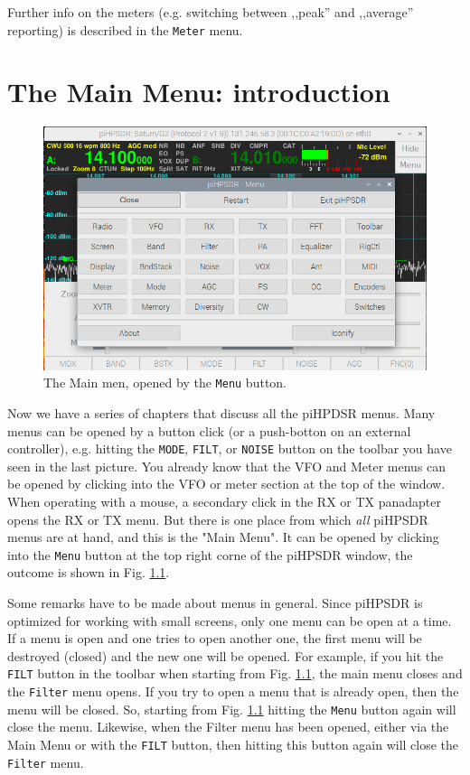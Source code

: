 \documentclass[12pt]{book}
\def\rett#1{\texttt{\color{red}#1}}
\def\bltt#1{\texttt{\color{blue}#1}}
\begin{document}
Further info on the meters (e.g. switching between ,,peak'' and ,,average'' reporting)
is described in the \bltt{Meter} menu.

\chapter{The Main Menu: introduction}

\begin{figure}[ht]
\center
\includegraphics[width=12cm]{MainMenu.png}
\caption{The Main men, opened by the \rett{Menu} button.}
\label{fig:MainMenu}
\end{figure}

Now we have a series of chapters that discuss all the piHPDSR menus. Many menus can be
opened by a button click (or a push-botton on an external controller), e.g. hitting the
 \rett{MODE}, \rett{FILT}, or \rett{NOISE} button on the
toolbar you have seen in the last picture. You already know that the VFO and Meter
menus can be opened by clicking into the VFO or meter section at the top of the window.
When operating with a mouse, a secondary click in the RX or TX panadapter opens the
RX or TX menu. But there is one place from which \textit{all} piHPSDR menus are at hand,
and this is the "Main Menu". It can be opened by clicking into the \rett{Menu} button at the
top right corne of the piHPSDR window, the outcome is shown in Fig. \ref{fig:MainMenu}.

Some remarks have to be made about menus in general. Since piHPSDR is optimized for
working with small screens, only one menu can be open at a time. If a menu is open
and one tries to open another one, the first menu will be destroyed (closed) and the
new one will be opened. For example, if you hit the \rett{FILT} button in the toolbar
when starting from Fig. \ref{fig:MainMenu}, the main menu closes and the \bltt{Filter} menu
opens. If you try to open a menu that is already open, then the menu will be closed.
So, starting from Fig. \ref{fig:MainMenu} hitting the \rett{Menu} button again will close
the menu. Likewise, when the Filter menu has been opened, either via the Main Menu
or with the \rett{FILT} button, then hitting this button again will close the 
\bltt{Filter} menu.
\end{document}
